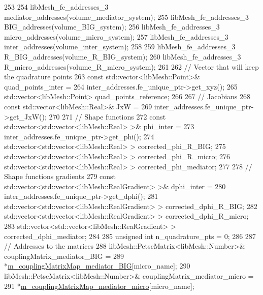 \begin{DoxyCode}
253 
254         libMesh\_fe\_addresses\_3 mediator\_addresses(volume\_mediator\_system);
255         libMesh\_fe\_addresses\_3 BIG\_addresses(volume\_BIG\_system);
256         libMesh\_fe\_addresses\_3 micro\_addresses(volume\_micro\_system);
257         libMesh\_fe\_addresses\_3 inter\_addresses(volume\_inter\_system);
258 
259         libMesh\_fe\_addresses\_3 R\_BIG\_addresses(volume\_R\_BIG\_system);
260         libMesh\_fe\_addresses\_3 R\_micro\_addresses(volume\_R\_micro\_system);
261 
262         \textcolor{comment}{// Vector that will keep the quadrature points}
263         \textcolor{keyword}{const} std::vector<libMesh::Point>& quad\_points\_inter =
264                 inter\_addresses.fe\_unique\_ptr->get\_xyz();
265         std::vector<libMesh::Point> quad\_points\_reference;
266 
267         \textcolor{comment}{// Jacobians}
268         \textcolor{keyword}{const} std::vector<libMesh::Real>& JxW =
269                 inter\_addresses.fe\_unique\_ptr->get\_JxW();
270 
271         \textcolor{comment}{// Shape functions}
272         \textcolor{keyword}{const} std::vector<std::vector<libMesh::Real> >& phi\_inter =
273                 inter\_addresses.fe\_unique\_ptr->get\_phi();
274         std::vector<std::vector<libMesh::Real> > corrected\_phi\_R\_BIG;
275         std::vector<std::vector<libMesh::Real> > corrected\_phi\_R\_micro;
276         std::vector<std::vector<libMesh::Real> > corrected\_phi\_mediator;
277 
278         \textcolor{comment}{// Shape functions gradients}
279         \textcolor{keyword}{const} std::vector<std::vector<libMesh::RealGradient> >& dphi\_inter =
280                 inter\_addresses.fe\_unique\_ptr->get\_dphi();
281         std::vector<std::vector<libMesh::RealGradient> > corrected\_dphi\_R\_BIG;
282         std::vector<std::vector<libMesh::RealGradient> > corrected\_dphi\_R\_micro;
283         std::vector<std::vector<libMesh::RealGradient> > corrected\_dphi\_mediator;
284 
285         \textcolor{keywordtype}{unsigned} \textcolor{keywordtype}{int} n\_quadrature\_pts = 0;
286 
287         \textcolor{comment}{// Addresses to the matrices}
288         libMesh::PetscMatrix<libMesh::Number>& couplingMatrix\_mediator\_BIG =
289                 *\hyperlink{classcarl_1_1assemble__coupling__matrices_af8127910d360a01b1b9c9878f03282f4}{m\_couplingMatrixMap\_mediator\_BIG}[micro\_name];
290         libMesh::PetscMatrix<libMesh::Number>& couplingMatrix\_mediator\_micro =
291                 *\hyperlink{classcarl_1_1assemble__coupling__matrices_a73accf79c46d9ceab7f66f0e26c5e677}{m\_couplingMatrixMap\_mediator\_micro}[micro\_name];

\end{DoxyCode}
